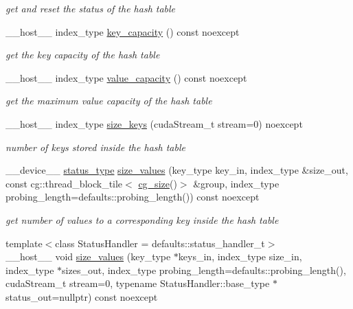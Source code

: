 \begin{DoxyCompactItemize}
\begin{DoxyCompactList}\small\item\em get and reset the status of the hash table \end{DoxyCompactList}\item 
\+\_\+\+\_\+host\+\_\+\+\_\+ index\+\_\+type \hyperlink{classwarpcore_1_1MultiValueHashTable_aabaa179a3e1b49f37f1a23adb0b33092}{key\+\_\+capacity} () const noexcept
\begin{DoxyCompactList}\small\item\em get the key capacity of the hash table \end{DoxyCompactList}\item 
\+\_\+\+\_\+host\+\_\+\+\_\+ index\+\_\+type \hyperlink{classwarpcore_1_1MultiValueHashTable_a5e5959606f5446959d56758b957626fa}{value\+\_\+capacity} () const noexcept
\begin{DoxyCompactList}\small\item\em get the maximum value capacity of the hash table \end{DoxyCompactList}\item 
\+\_\+\+\_\+host\+\_\+\+\_\+ index\+\_\+type \hyperlink{classwarpcore_1_1MultiValueHashTable_a9ab8c6741cc029d28bb4435b54bdf3d6}{size\+\_\+keys} (cuda\+Stream\+\_\+t stream=0) noexcept
\begin{DoxyCompactList}\small\item\em number of keys stored inside the hash table \end{DoxyCompactList}\item 
\+\_\+\+\_\+device\+\_\+\+\_\+ \hyperlink{classwarpcore_1_1Status}{status\+\_\+type} \hyperlink{classwarpcore_1_1MultiValueHashTable_a8e1c0d96983af892804a6513964692c2}{size\+\_\+values} (key\+\_\+type key\+\_\+in, index\+\_\+type \&size\+\_\+out, const cg\+::thread\+\_\+block\+\_\+tile$<$ \hyperlink{classwarpcore_1_1MultiValueHashTable_a2191f42810234e459bc4ef6e491ec929}{cg\+\_\+size}()$>$ \&group, index\+\_\+type probing\+\_\+length=defaults\+::probing\+\_\+length()) const noexcept
\begin{DoxyCompactList}\small\item\em get number of values to a corresponding key inside the hash table \end{DoxyCompactList}\item 
{\footnotesize template$<$class Status\+Handler  = defaults\+::status\+\_\+handler\+\_\+t$>$ }\\\+\_\+\+\_\+host\+\_\+\+\_\+ void \hyperlink{classwarpcore_1_1MultiValueHashTable_acefa26ef6c5d07d909e6758fa9cc88c7}{size\+\_\+values} (key\+\_\+type $\ast$keys\+\_\+in, index\+\_\+type size\+\_\+in, index\+\_\+type $\ast$sizes\+\_\+out, index\+\_\+type probing\+\_\+length=defaults\+::probing\+\_\+length(), cuda\+Stream\+\_\+t stream=0, typename Status\+Handler\+::base\+\_\+type $\ast$status\+\_\+out=nullptr) const noexcept

\end{DoxyCompactItemize}
